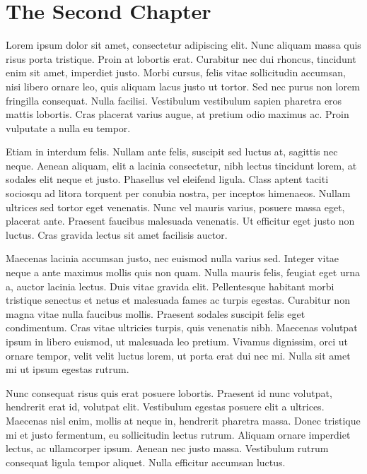 
\newpage
\chapter{The Second Chapter}


Lorem ipsum dolor sit amet, consectetur adipiscing elit. Nunc aliquam massa quis risus porta tristique. Proin at lobortis erat. Curabitur nec dui rhoncus, tincidunt enim sit amet, imperdiet justo. Morbi cursus, felis vitae sollicitudin accumsan, nisi libero ornare leo, quis aliquam lacus justo ut tortor. Sed nec purus non lorem fringilla consequat. Nulla facilisi. Vestibulum vestibulum sapien pharetra eros mattis lobortis. Cras placerat varius augue, at pretium odio maximus ac. Proin vulputate a nulla eu tempor.

Etiam in interdum felis. Nullam ante felis, suscipit sed luctus at, sagittis nec neque. Aenean aliquam, elit a lacinia consectetur, nibh lectus tincidunt lorem, at sodales elit neque et justo. Phasellus vel eleifend ligula. Class aptent taciti sociosqu ad litora torquent per conubia nostra, per inceptos himenaeos. Nullam ultrices sed tortor eget venenatis. Nunc vel mauris varius, posuere massa eget, placerat ante. Praesent faucibus malesuada venenatis. Ut efficitur eget justo non luctus. Cras gravida lectus sit amet facilisis auctor.

Maecenas lacinia accumsan justo, nec euismod nulla varius sed. Integer vitae neque a ante maximus mollis quis non quam. Nulla mauris felis, feugiat eget urna a, auctor lacinia lectus. Duis vitae gravida elit. Pellentesque habitant morbi tristique senectus et netus et malesuada fames ac turpis egestas. Curabitur non magna vitae nulla faucibus mollis. Praesent sodales suscipit felis eget condimentum. Cras vitae ultricies turpis, quis venenatis nibh. Maecenas volutpat ipsum in libero euismod, ut malesuada leo pretium. Vivamus dignissim, orci ut ornare tempor, velit velit luctus lorem, ut porta erat dui nec mi. Nulla sit amet mi ut ipsum egestas rutrum.

Nunc consequat risus quis erat posuere lobortis. Praesent id nunc volutpat, hendrerit erat id, volutpat elit. Vestibulum egestas posuere elit a ultrices. Maecenas nisl enim, mollis at neque in, hendrerit pharetra massa. Donec tristique mi et justo fermentum, eu sollicitudin lectus rutrum. Aliquam ornare imperdiet lectus, ac ullamcorper ipsum. Aenean nec justo massa. Vestibulum rutrum consequat ligula tempor aliquet. Nulla efficitur accumsan luctus.

